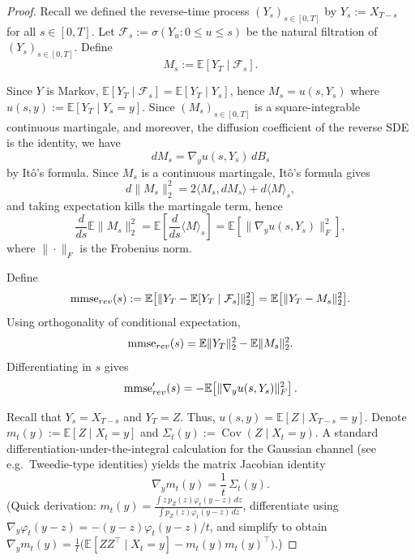 \documentclass[10pt,a4paper]{amsart}
\begin{document}
\begin{proof}

Recall we defined the reverse-time process $(Y_s)_{s\in[0,T]}$ by $Y_s := X_{T-s}$ for all $s\in[0,T]$. Let $\mathcal F_s:=\sigma(Y_u:0\le u\le s)$ be the natural filtration of $(Y_s)_{s\in[0,T]}$. Define 
\[
M_s:=\mathbb E[Y_T\mid \mathcal F_s].
\]

Since $Y$ is Markov, $\mathbb E[Y_T\mid \mathcal F_s]=\mathbb E[Y_T\mid Y_s]$, hence
$M_s=u(s,Y_s)$ where $u(s,y):=\mathbb E[Y_T\mid Y_s=y]$.
Since $(M_s)_{s\in[0,T]}$ is a square-integrable
continuous martingale, and moreover, the diffusion coefficient of the reverse SDE is the identity,
we have
\[
dM_s = \nabla_y u(s,Y_s)\, d B_s
\]
by It\^o's formula. 
Since $M_s$ is a continuous martingale, It\^o's formula gives
\[
d\|M_s\|_2^2 = 2\langle M_s, dM_s\rangle + d\langle M\rangle_s,
\]
and taking expectation kills the martingale term, hence
\begin{equation*}
\frac{d}{ds}\mathbb E\|M_s\|_2^2
=\mathbb E\!\left[\frac{d}{ds}\langle M\rangle_s\right]
=\mathbb E\!\left[\|\nabla_y u(s,Y_s)\|_F^2\right],
\end{equation*}
where $\|\cdot\|_F$ is the Frobenius norm. 

Define
\[
\mathrm{mmse}_{\rm rev}(s):=\mathbb E\big[\|Y_T-\mathbb E[Y_T\mid \mathcal F_s]\|_2^2\big]
=\mathbb E\big[\|Y_T-M_s\|_2^2\big].
\]
Using orthogonality of conditional expectation,
\[
\mathrm{mmse}_{\rm rev}(s)=\mathbb E\|Y_T\|_2^2-\mathbb E\|M_s\|_2^2.
\]
Differentiating in $s$ gives
\begin{equation}
\mathrm{mmse}_{\rm rev}'(s)
=-\mathbb E\!\left[\|\nabla_y u(s,Y_s)\|_F^2\right].
\label{eq:mmse-rev-deriv}
\end{equation}

Recall that $Y_s=X_{T-s}$ and $Y_T=Z$. Thus, $u(s,y)=\mathbb E[Z\mid X_{T-s}=y]$. Denote $m_t(y):=\mathbb E[Z\mid X_t=y]$ and
$\Sigma_t(y):=\operatorname{Cov}(Z\mid X_t=y)$.
A standard differentiation-under-the-integral calculation for the Gaussian channel
(see e.g.\ Tweedie-type identities) yields the matrix Jacobian identity
\begin{equation}
\nabla_y m_t(y)=\frac{1}{t}\,\Sigma_t(y).
\label{eq:jacobian-cov}
\end{equation}
(Quick derivation: $m_t(y)=\frac{\int z\,p_Z(z)\varphi_t(y-z)\,dz}{\int p_Z(z)\varphi_t(y-z)\,dz}$,
differentiate using $\nabla_y\varphi_t(y-z)=-(y-z)\varphi_t(y-z)/t$, and simplify to obtain
$\nabla_y m_t(y)=\frac{1}{t}\big(\mathbb E[ZZ^\top\!\mid X_t=y]-m_t(y)m_t(y)^\top\big)$.)


\end{proof}
\end{document}
